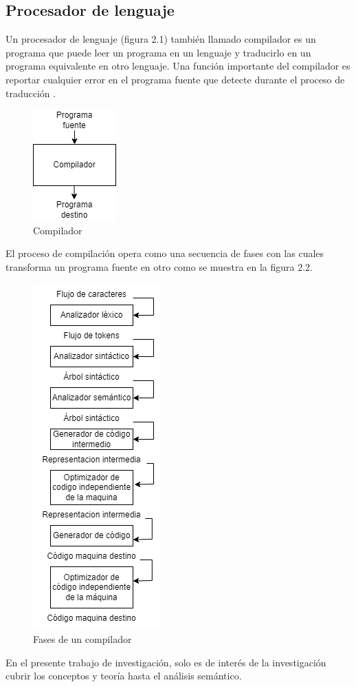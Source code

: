 \subsection{Procesador de lenguaje}
Un procesador de lenguaje (figura 2.1) también llamado compilador es un programa que puede leer un programa en un lenguaje y traducirlo en un programa equivalente en otro lenguaje. Una función importante del compilador es reportar cualquier error en el programa fuente que detecte durante el proceso de traducción \cite{aho2008compiladores}.
\begin{figure}[htb]
\centering
\includegraphics[scale=0.8]{imagenes/compilador}
\caption{Compilador}
\end{figure}
El proceso de compilación opera como una secuencia de fases con las cuales transforma un programa fuente en otro como se muestra en la figura 2.2.
\begin{figure}[htb]
\centering
\includegraphics[scale=0.8]{imagenes/fasesCompilador}
\caption{Fases de un compilador}
\end{figure}
En el presente trabajo de investigación, solo es de interés de la investigación cubrir los conceptos y teoría hasta el análisis semántico.
